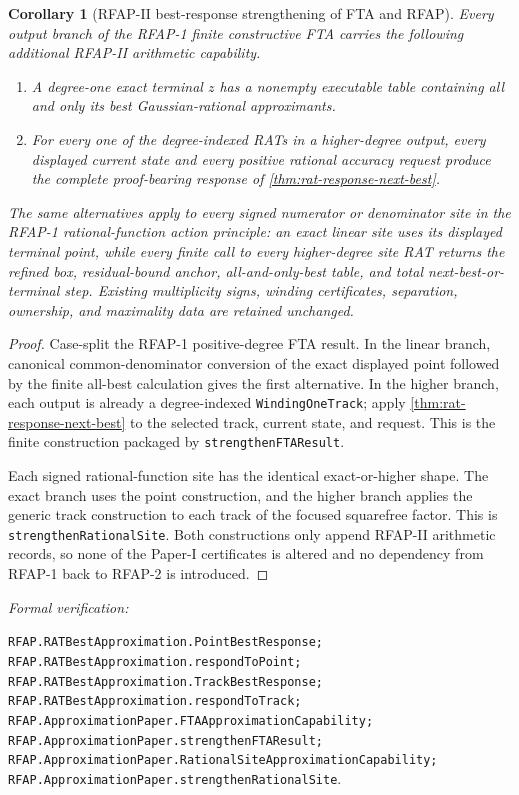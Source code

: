 \documentclass[11pt]{article}
\newtheorem{corollary}[corollary]{Corollary}
\newcommand{\leanref}[1]{\par\smallskip\noindent
  \emph{Formal verification:}\par\nobreak
  {\raggedright\nolinkurl{#1}.\par}}
\begin{document}
\begin{corollary}[RFAP-II best-response strengthening of FTA and RFAP]
\label{cor:fta-rfap-best-response}
Every output branch of the RFAP-1 finite constructive FTA carries the
following additional RFAP-II arithmetic capability.
\begin{enumerate}[label=(\roman*)]
\item A degree-one exact terminal $z$ has a nonempty executable table
      containing all and only its best Gaussian-rational approximants.
\item For every one of the degree-indexed RATs in a higher-degree output,
      every displayed current state and every positive rational accuracy
      request produce the complete proof-bearing response of
      \cref{thm:rat-response-next-best}.
\end{enumerate}
The same alternatives apply to every signed numerator or denominator site in
the RFAP-1 rational-function action principle: an exact linear site uses its
displayed terminal point, while every finite call to every higher-degree site
RAT returns the refined box, residual-bound anchor, all-and-only-best table,
and total next-best-or-terminal step.  Existing multiplicity signs, winding
certificates, separation, ownership, and maximality data are retained
unchanged.
\end{corollary}

\begin{proof}
Case-split the RFAP-1 positive-degree FTA result.  In the linear branch,
canonical common-denominator conversion of the exact displayed point followed
by the finite all-best calculation gives the first alternative.  In the
higher branch, each output is already a degree-indexed
\texttt{WindingOneTrack}; apply \cref{thm:rat-response-next-best} to the
selected track, current state, and request.  This is the finite construction
packaged by \texttt{strengthenFTAResult}.

Each signed rational-function site has the identical exact-or-higher shape.
The exact branch uses the point construction, and the higher branch applies
the generic track construction to each track of the focused squarefree
factor.  This is \texttt{strengthenRationalSite}.  Both constructions only
append RFAP-II arithmetic records, so none of the Paper-I certificates is
altered and no dependency from RFAP-1 back to RFAP-2 is introduced.
\end{proof}

\leanref{RFAP.RATBestApproximation.PointBestResponse;
RFAP.RATBestApproximation.respondToPoint;
RFAP.RATBestApproximation.TrackBestResponse;
RFAP.RATBestApproximation.respondToTrack;
RFAP.ApproximationPaper.FTAApproximationCapability;
RFAP.ApproximationPaper.strengthenFTAResult;
RFAP.ApproximationPaper.RationalSiteApproximationCapability;
RFAP.ApproximationPaper.strengthenRationalSite}
\end{document}
